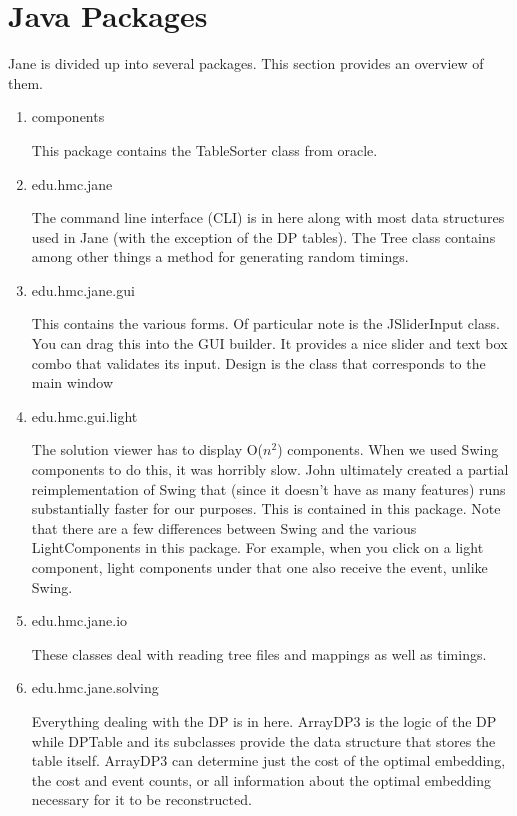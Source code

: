 \documentclass{article}
\begin{document}
\section{Java Packages}

Jane is divided up into several packages. This section provides an overview of them.

\begin{enumerate}
\item components

This package contains the TableSorter class from oracle.

\item edu.hmc.jane

The command line interface (CLI) is in here along with most data structures used in Jane (with the exception of the DP tables). The Tree class contains among other things a method for generating random timings.

\item edu.hmc.jane.gui

This contains the various forms. Of particular note is the JSliderInput class. You can drag this into the GUI builder. It provides a nice slider and text box combo that validates its input. Design is the class that corresponds to the main window

\item edu.hmc.gui.light

The solution viewer has to display O($n^2$) components. When we used Swing components to do this, it was horribly slow. John ultimately created a partial reimplementation of Swing that (since it doesn't have as many features) runs substantially faster for our purposes. This is contained in this package. Note that there are a few differences between Swing and the various LightComponents in this package. For example, when you click on a light component, light components under that one also receive the event, unlike Swing.

\item edu.hmc.jane.io

These classes deal with reading tree files and mappings as well as timings.

\item edu.hmc.jane.solving

Everything dealing with the DP is in here. ArrayDP3 is the logic of the DP while DPTable and its subclasses provide the data structure that stores the table itself. ArrayDP3 can determine just the cost of the optimal embedding, the cost and event counts, or all information about the optimal embedding necessary for it to be reconstructed.


\end{enumerate}
\end{document}

